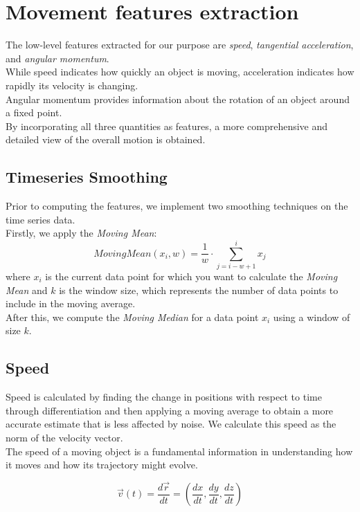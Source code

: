 \section{Movement features extraction}
\label{sec:features}
The low-level features extracted for our purpose are \textit{speed}, \textit{tangential acceleration}, and \textit{angular momentum}. \\
While speed indicates how quickly an object is moving, acceleration indicates how rapidly its velocity is changing.\\
Angular momentum provides information about the rotation of an object around a fixed point.\\
By incorporating all three quantities as features, a more comprehensive and detailed view of the overall motion is obtained.

\subsection{Timeseries Smoothing}
Prior to computing the features, we implement two smoothing techniques on the time series data. \\
Firstly, we apply the \textit{Moving Mean}:
\begin{equation}
  Moving Mean(x_i, w) = \frac{1}{w} \cdot \sum_{j=i-w+1}^{i} x_j
\end{equation}
where $x_i$ is the current data point for which you want to calculate the \textit{Moving Mean} and $k$ is the window size, which represents the number of data points to include in the moving average. \\
After this, we compute the \textit{Moving Median} for a data point $x_i$ using a window of size $k$. 

\subsection{Speed}
Speed is calculated by finding the change in positions with respect to time through differentiation and then applying a moving average to obtain a more accurate estimate that is less affected by noise.
We calculate this speed as the norm of the velocity vector. \\
The speed of a moving object is a fundamental information in understanding how it moves and how its trajectory might evolve.

\begin{equation}
  \vec{v}(t) = \frac{d\vec{r}}{dt} = \left(\frac{dx}{dt}, \frac{dy}{dt}, \frac{dz}{dt}\right)
\end{equation}

